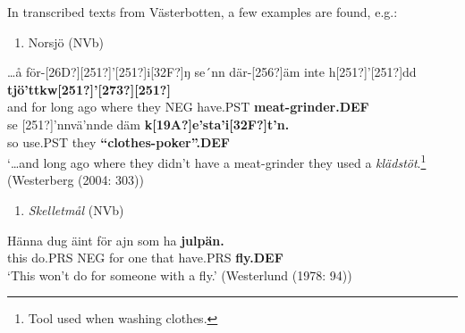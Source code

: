 In transcribed texts from Västerbotten, a few examples are found, e.g.:

\begin{enumerate} %
\item 
Norsjö (NVb)

\end{enumerate} %
\ea\label{}
\gll …å  för-[26D?][251?]’[251?]i[32F?]ŋ  se´nn  där-[256?]äm  inte  h[251?]’[251?]dd  \textbf{tjö’ttkw[251?]’[273?][251?]}\\


and  for long  ago  where they  NEG  have.PST  \textbf{meat-grinder.DEF}\\ %


\ea\label{}
\gll se  [251?]’nnvä’nnde  däm  \textbf{k}\textbf{[19A?]}\textbf{e’sta’i[32F?]t’n.}\\


so  use.PST  they  \textbf{“clothes-poker”.DEF}\\ %


‘…and long ago where they didn’t have a meat-grinder they used a \textit{klädstöt}.\footnote{ Tool used when washing clothes.} (Westerberg (2004: 303))
\z

\begin{enumerate} %
\item 
\textit{Skelletmål} (NVb)
\end{enumerate} %
\ea\label{}
\gll Hänna  dug  äint  för  ajn  som  ha  \textbf{julpän.} \\


this  do.PRS  NEG  for  one  that  have.PRS  \textbf{fly.DEF} \\ %


‘This won’t do for someone with a fly.’ (Westerlund (1978: 94))
\z

